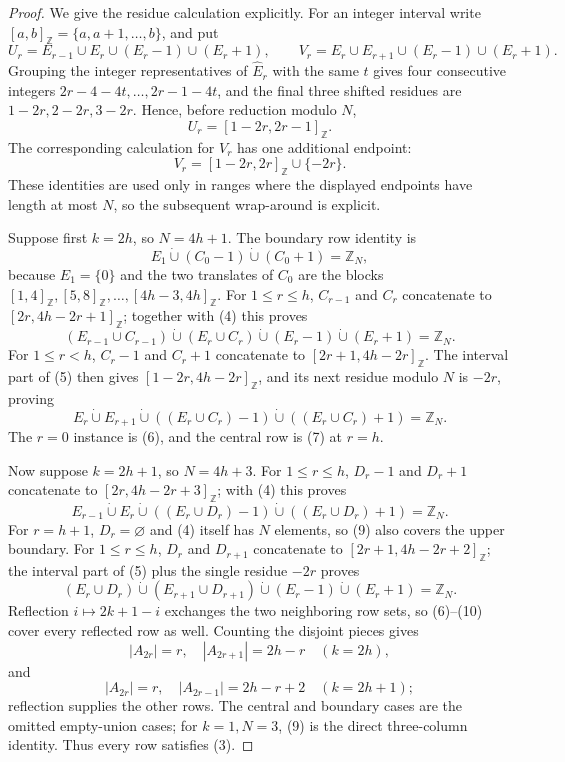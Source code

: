 \documentclass[11pt]{article}
\theoremstyle{definition}
\begin{document}
\begin{proof}
We give the residue calculation explicitly. For an integer interval write
\([a,b]_{\mathbb Z}=\{a,a+1,\ldots,b\}\), and put
\[
U_r=E_{r-1}\cup E_r\cup(E_r-1)\cup(E_r+1),\qquad
V_r=E_r\cup E_{r+1}\cup(E_r-1)\cup(E_r+1).
\]
Grouping the integer representatives of \(\widehat E_r\) with the same
\(t\) gives four consecutive integers
\(2r-4-4t,\ldots,2r-1-4t\), and the final three shifted residues are
\(1-2r,2-2r,3-2r\). Hence, before reduction modulo \(N\),
\[
U_r=[1-2r,2r-1]_{\mathbb Z}.                                \tag{4}
\]
The corresponding calculation for \(V_r\) has one additional endpoint:
\[
V_r=[1-2r,2r]_{\mathbb Z}\cup\{-2r\}.                        \tag{5}
\]
These identities are used only in ranges where the displayed endpoints
have length at most \(N\), so the subsequent wrap-around is explicit.

Suppose first \(k=2h\), so \(N=4h+1\). The boundary row identity is
\[
E_1\dot\cup(C_0-1)\dot\cup(C_0+1)=\mathbb Z_N,                \tag{6}
\]
because \(E_1=\{0\}\) and the two translates of \(C_0\) are the blocks
\([1,4]_{\mathbb Z},[5,8]_{\mathbb Z},\ldots,[4h-3,4h]_{\mathbb Z}\).
For \(1\le r\le h\), \(C_{r-1}\) and \(C_r\) concatenate to
\([2r,4h-2r+1]_{\mathbb Z}\); together with (4) this proves
\[
(E_{r-1}\cup C_{r-1})\dot\cup(E_r\cup C_r)
\dot\cup(E_r-1)\dot\cup(E_r+1)=\mathbb Z_N.                   \tag{7}
\]
For \(1\le r<h\), \(C_r-1\) and \(C_r+1\) concatenate to
\([2r+1,4h-2r]_{\mathbb Z}\). The interval part of (5) then gives
\([1-2r,4h-2r]_{\mathbb Z}\), and its next residue modulo \(N\) is
\(-2r\), proving
\[
E_r\dot\cup E_{r+1}\dot\cup((E_r\cup C_r)-1)
\dot\cup((E_r\cup C_r)+1)=\mathbb Z_N.                       \tag{8}
\]
The \(r=0\) instance is (6), and the central row is (7) at \(r=h\).

Now suppose \(k=2h+1\), so \(N=4h+3\). For \(1\le r\le h\),
\(D_r-1\) and \(D_r+1\) concatenate to
\([2r,4h-2r+3]_{\mathbb Z}\); with (4) this proves
\[
E_{r-1}\dot\cup E_r\dot\cup((E_r\cup D_r)-1)
\dot\cup((E_r\cup D_r)+1)=\mathbb Z_N.                       \tag{9}
\]
For \(r=h+1\), \(D_r=\varnothing\) and (4) itself has \(N\) elements,
so (9) also covers the upper boundary. For \(1\le r\le h\), \(D_r\)
and \(D_{r+1}\) concatenate to
\([2r+1,4h-2r+2]_{\mathbb Z}\); the interval part of (5) plus the
single residue \(-2r\) proves
\[
(E_r\cup D_r)\dot\cup(E_{r+1}\cup D_{r+1})
\dot\cup(E_r-1)\dot\cup(E_r+1)=\mathbb Z_N.                  \tag{10}
\]
Reflection \(i\mapsto2k+1-i\) exchanges the two neighboring row sets,
so (6)--(10) cover every reflected row as well. Counting the disjoint
pieces gives
\[
 |A_{2r}|=r,\quad |A_{2r+1}|=2h-r\quad(k=2h),
\]
and
\[
 |A_{2r}|=r,\quad |A_{2r-1}|=2h-r+2\quad(k=2h+1);
\]
reflection supplies the other rows. The central and boundary cases are
the omitted empty-union cases; for \(k=1,N=3\), (9) is the direct
three-column identity. Thus every row satisfies (3).
\end{proof}
\end{document}
